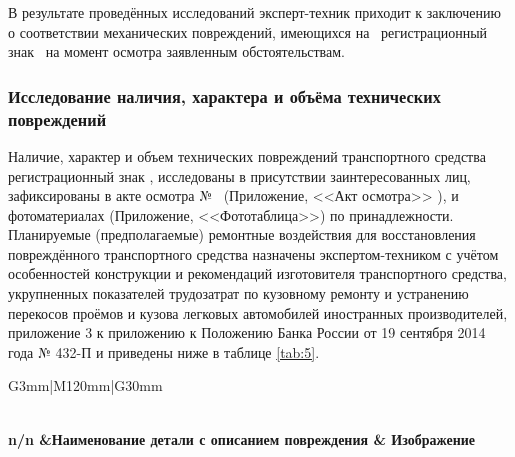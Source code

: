 В результате проведённых исследований эксперт-техник приходит к заключению о соответствии механических повреждений, имеющихся на \, регистрационный знак \, на момент осмотра заявленным обстоятельствам. 


\subsubsection{Исследование наличия, характера и объёма технических повреждений}

  Наличие, характер и объем технических повреждений транспортного средства \tc\, регистрационный знак \grz, исследованы в присутствии заинтересованных лиц,  зафиксированы в акте осмотра № \NomerDoc\,  (Приложение, <<Акт осмотра>> ),  и фотоматериалах (Приложение, <<Фототаблица>>) по принадлежности. Планируемые (предполагаемые) ремонтные воздействия для восстановления повреждённого  транспортного средства назначены экспертом-техником с учётом особенностей конструкции и рекомендаций изготовителя  транспортного средства, укрупненных показателей трудозатрат по кузовному ремонту и устранению перекосов проёмов и кузова легковых автомобилей иностранных производителей, приложение 3 к приложению к Положению Банка России от 19 сентября 2014 года № 432-П и приведены ниже в таблице \ref{tab:5}.
 
  
  \begin{longtable}{G{3mm}|M{120mm}|G{30mm}}
      \caption[]{\footnotesize {Повреждения автомобиля, установленные при его осмотре}} 
      \label{tab:5}\\ 
      \hline 
      \hline  \toprule 
\bf  {\footnotesize  n/n}  &\bf {\small Наименование  детали с описанием повреждения} & \bf {\small Изображение} \\   \hline\hline  \toprule \endhead 




      
  \end{longtable}
  
